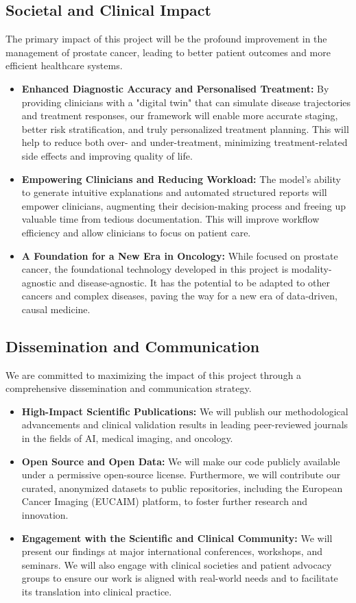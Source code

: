 \documentclass[11pt, a4paper]{article}
\begin{document}
\subsection{Societal and Clinical Impact}
The primary impact of this project will be the profound improvement in the management of prostate cancer, leading to better patient outcomes and more efficient healthcare systems.
\begin{itemize}
    \item \textbf{Enhanced Diagnostic Accuracy and Personalised Treatment:} By providing clinicians with a "digital twin" that can simulate disease trajectories and treatment responses, our framework will enable more accurate staging, better risk stratification, and truly personalized treatment planning. This will help to reduce both over- and under-treatment, minimizing treatment-related side effects and improving quality of life.
    \item \textbf{Empowering Clinicians and Reducing Workload:} The model's ability to generate intuitive explanations and automated structured reports will empower clinicians, augmenting their decision-making process and freeing up valuable time from tedious documentation. This will improve workflow efficiency and allow clinicians to focus on patient care.
    \item \textbf{A Foundation for a New Era in Oncology:} While focused on prostate cancer, the foundational technology developed in this project is modality-agnostic and disease-agnostic. It has the potential to be adapted to other cancers and complex diseases, paving the way for a new era of data-driven, causal medicine.
\end{itemize}

\subsection{Dissemination and Communication}
We are committed to maximizing the impact of this project through a comprehensive dissemination and communication strategy.
\begin{itemize}
    \item \textbf{High-Impact Scientific Publications:} We will publish our methodological advancements and clinical validation results in leading peer-reviewed journals in the fields of AI, medical imaging, and oncology.
    \item \textbf{Open Source and Open Data:} We will make our code publicly available under a permissive open-source license. Furthermore, we will contribute our curated, anonymized datasets to public repositories, including the European Cancer Imaging (EUCAIM) platform, to foster further research and innovation.
    \item \textbf{Engagement with the Scientific and Clinical Community:} We will present our findings at major international conferences, workshops, and seminars. We will also engage with clinical societies and patient advocacy groups to ensure our work is aligned with real-world needs and to facilitate its translation into clinical practice.
\end{itemize}
\end{document}
